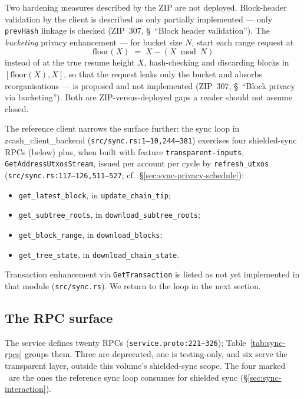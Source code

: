 \documentclass[11pt,a4paper]{article}
\theoremstyle{definition}
\begin{document}
Two hardening measures described by the ZIP are not deployed. Block-header
validation by the client is described as only partially implemented ---
only \texttt{prevHash} linkage is checked (ZIP~307, \S~``Block header
validation''). The \emph{bucketing} privacy enhancement --- for bucket
size $N$, start each range request at
\[
\mathrm{floor}(X) \;=\; X - (X \bmod N)
\]
instead of at the true resume height $X$, hash-checking and discarding
blocks in $[\mathrm{floor}(X), X]$, so that the request leaks only the
bucket and absorbs reorganisations --- is proposed and not implemented
(ZIP~307, \S~``Block privacy via bucketing''). Both are ZIP-versus-deployed
gaps a reader should not assume closed.

The reference client narrows the surface further: the sync loop in
\textsf{zcash\_client\_backend}
(\texttt{src/sync.rs:1--10,244--381}) exercises four shielded-sync RPCs
(below) plus, when built with feature \texttt{transparent-inputs},
\texttt{GetAddressUtxosStream}, issued per account per cycle by
\texttt{refresh\_utxos} (\texttt{src/sync.rs:117--126,511--527}; cf.\
\S\ref{sec:sync-privacy-schedule}):
\begin{itemize}
\item \texttt{get\_latest\_block}, in \texttt{update\_chain\_tip};
\item \texttt{get\_subtree\_roots}, in \texttt{download\_subtree\_roots};
\item \texttt{get\_block\_range}, in \texttt{download\_blocks};
\item \texttt{get\_tree\_state}, in \texttt{download\_chain\_state}.
\end{itemize}
Transaction enhancement via \texttt{GetTransaction} is listed as not yet
implemented in that module (\texttt{src/sync.rs}). We return to the loop
in the next section.

\subsection{The RPC surface}\label{sec:sync-rpcs}

The service defines twenty RPCs (\texttt{service.proto:221--326});
Table~\ref{tab:sync-rpcs} groups them. Three are deprecated, one is
testing-only, and six serve the transparent layer, outside this volume's
shielded-sync scope. The four marked \checkmark\ are the ones the
reference sync loop consumes for shielded sync
(\S\ref{sec:sync-interaction}).
\end{document}

